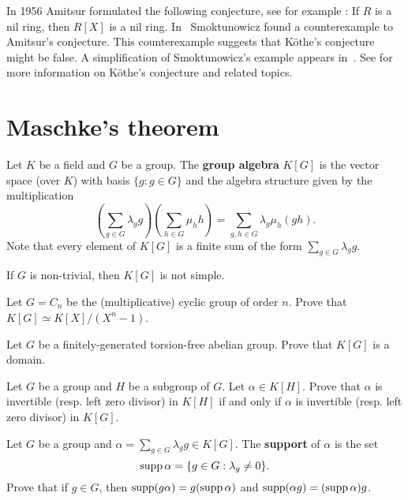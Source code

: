 In 1956 Amitsur formulated the following conjecture, see for example
\cite{MR0347873}: If $R$ is a nil ring, then $R[X]$ is a nil ring. In~\cite{MR1793911} 
Smoktunowicz found a counterexample to Amitsur's conjecture. 
This counterexample suggests that K\"othe's conjecture might be false. 
A simplification of Smoktunowicz's example
appears in~\cite{MR3169522}. See \cite{MR1879880,MR2275597} for more
information on K\"othe's conjecture and related topics. 

\section*{Maschke's theorem}

Let $K$ be a field and $G$ be a group. The \textbf{group algebra} $K[G]$ 
is the vector space (over $K$) with basis $\{g:g\in G\}$ 
and the algebra structure given by the multiplication
\[
	\left(\sum_{g\in G}\lambda_gg\right)\left(\sum_{h\in G}\mu_hh\right)
	=\sum_{g,h\in G}\lambda_g\mu_h(gh).
\]
Note that every element of $K[G]$ is a finite sum of the form $\sum_{g\in G}\lambda_gg$.

\begin{exercise}
\label{xc:K[G]notsimple}
    If $G$ is non-trivial, then $K[G]$ is not simple. 
\end{exercise}

\begin{exercise}
	Let $G=C_n$ be the (multiplicative) cyclic group of order $n$. Prove that 
	$K[G]\simeq K[X]/(X^n-1)$. 
\end{exercise}

\begin{exercise}
	Let $G$ be a finitely-generated torsion-free abelian group. Prove that 
	$K[G]$ is a domain. 
\end{exercise}

\begin{exercise}
	Let $G$ be a group and $H$ be a subgroup of $G$. Let $\alpha\in K[H]$. Prove that 
    $\alpha$ is invertible (resp. left zero divisor) in $K[H]$ if and only if 
	$\alpha$ is invertible (resp. left zero divisor) in
	$K[G]$.
\end{exercise}

\begin{exercise}
	Let $G$ be a group and $\alpha=\sum_{g\in G}\lambda_gg\in K[G]$.  
	The \textbf{support} of $\alpha$ is the set 
	\[
		\operatorname{supp}\alpha=\{g\in G:\lambda_g\ne 0\}.
	\]
	Prove that if $g\in G$, then 
	$\operatorname{supp}(g\alpha)=g(\operatorname{supp}\alpha)$ and $\operatorname{supp}(\alpha g)=(\operatorname{supp}\alpha)g$.
\end{exercise}

